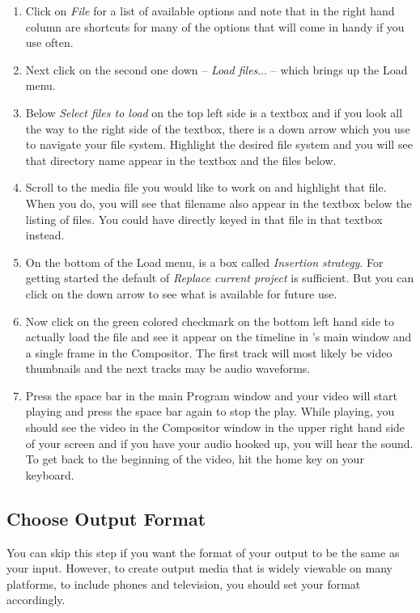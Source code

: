 \begin{enumerate}
	\item Click on \textit{File} for a list of available options and note that in the right hand column are shortcuts for
	many of the options that will come in handy if you use \CGG{} often.
	\item Next click on the second one down -- \textit{Load files$\dots$} -- which brings up the Load menu.
	\item Below \textit{Select files to load} on the top left side is a textbox and if you look all the way to the right
	side of the textbox, there is a down arrow which you use to navigate your file system.  Highlight the
	desired file system and you will see that directory name appear in the textbox and the files below.
	\item Scroll to the media file you would like to work on and highlight that file.  When you do, you will
	see that filename also appear in the textbox below the listing of files.  You could have directly
	keyed in that file in that textbox instead.
	\item On the bottom of the Load menu, is a box called \textit{Insertion strategy}.  For getting started the
	default of \textit{Replace current project} is sufficient.  But you can click on the down arrow to see what
	is available for future use.
	\item Now click on the green colored checkmark on the bottom left hand side to actually load the file
	and see it appear on the timeline in \CGG{}’s main window and a single frame in the Compositor.
	The first track will most likely be video thumbnails and the next tracks may be audio waveforms.
	\item Press the space bar in the main Program window and your video will start playing and press the
	space bar again to stop the play.  While playing, you should see the video in the Compositor
	window in the upper right hand side of your screen and if you have your audio hooked up, you
	will hear the sound.  To get back to the beginning of the video, hit the home key on your keyboard.
\end{enumerate}

\subsection{Choose Output Format}%
\label{sub:choose_output_format}
	
You can skip this step if you want the format of your output to be the same as your input.  However, to create output media that is widely viewable on many platforms, to include phones and television, you should set your format accordingly.

